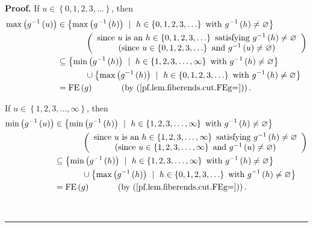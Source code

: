 \documentclass[numbers=enddot,12pt,final,onecolumn,notitlepage]{scrartcl}%
\theoremstyle{definition}
\newenvironment{proof}[1][Proof]{\noindent\textbf{#1.} }{\ \rule{0.5em}{0.5em}}
\newenvironment{verlong}{}{}
\begin{document}
\begin{verlong}
\begin{proof}
If $u\in\left\{  0,1,2,3,\ldots\right\}  $, then%
\begin{align}
\max\left(  g^{-1}\left(  u\right)  \right)   &  \in\left\{  \max\left(
g^{-1}\left(  h\right)  \right)  \ \mid\ h\in\left\{  0,1,2,3,\ldots\right\}
\text{ with }g^{-1}\left(  h\right)  \neq\varnothing\right\} \nonumber\\
&  \ \ \ \ \ \ \ \ \ \ \left(
\begin{array}
[c]{c}%
\text{since }u\text{ is an }h\in\left\{  0,1,2,3,\ldots\right\}  \text{
satisfying }g^{-1}\left(  h\right)  \neq\varnothing\\
\text{(since }u\in\left\{  0,1,2,3,\ldots\right\}  \text{ and }g^{-1}\left(
u\right)  \neq\varnothing\text{)}%
\end{array}
\right) \nonumber\\
&  \subseteq\left\{  \min\left(  g^{-1}\left(  h\right)  \right)  \ \mid
\ h\in\left\{  1,2,3,\ldots,\infty\right\}  \text{ with }g^{-1}\left(
h\right)  \neq\varnothing\right\} \nonumber\\
&  \ \ \ \ \ \ \ \ \ \ \cup\left\{  \max\left(  g^{-1}\left(  h\right)
\right)  \ \mid\ h\in\left\{  0,1,2,3,\ldots\right\}  \text{ with }%
g^{-1}\left(  h\right)  \neq\varnothing\right\} \nonumber\\
&  =\operatorname*{FE}\left(  g\right)  \ \ \ \ \ \ \ \ \ \ \left(  \text{by
(\ref{pf.lem.fiberends.cut.FEg=})}\right)  .
\label{pf.lem.fiberends.cut.maxin}%
\end{align}


If $u\in\left\{  1,2,3,\ldots,\infty\right\}  $, then%
\begin{align}
\min\left(  g^{-1}\left(  u\right)  \right)   &  \in\left\{  \min\left(
g^{-1}\left(  h\right)  \right)  \ \mid\ h\in\left\{  1,2,3,\ldots
,\infty\right\}  \text{ with }g^{-1}\left(  h\right)  \neq\varnothing\right\}
\nonumber\\
&  \ \ \ \ \ \ \ \ \ \ \left(
\begin{array}
[c]{c}%
\text{since }u\text{ is an }h\in\left\{  1,2,3,\ldots,\infty\right\}  \text{
satisfying }g^{-1}\left(  h\right)  \neq\varnothing\\
\text{(since }u\in\left\{  1,2,3,\ldots,\infty\right\}  \text{ and }%
g^{-1}\left(  u\right)  \neq\varnothing\text{)}%
\end{array}
\right) \nonumber\\
&  \subseteq\left\{  \min\left(  g^{-1}\left(  h\right)  \right)  \ \mid
\ h\in\left\{  1,2,3,\ldots,\infty\right\}  \text{ with }g^{-1}\left(
h\right)  \neq\varnothing\right\} \nonumber\\
&  \ \ \ \ \ \ \ \ \ \ \cup\left\{  \max\left(  g^{-1}\left(  h\right)
\right)  \ \mid\ h\in\left\{  0,1,2,3,\ldots\right\}  \text{ with }%
g^{-1}\left(  h\right)  \neq\varnothing\right\} \nonumber\\
&  =\operatorname*{FE}\left(  g\right)  \ \ \ \ \ \ \ \ \ \ \left(  \text{by
(\ref{pf.lem.fiberends.cut.FEg=})}\right)  .
\label{pf.lem.fiberends.cut.minin}%
\end{align}



\end{proof}
\end{verlong}
\end{document}
